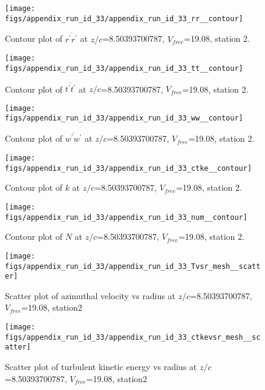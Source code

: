 \begin{figure}[H]
\centering
\texttt{[image: figs/appendix\_run\_id\_33/appendix\_run\_id\_33\_rr\_\_contour]}
\caption{Contour plot of $\overline{r^\prime r^\prime}$ at $z/c$=8.50393700787, $V_{free}$=19.08, station 2.}
\label{fig:appendix_run_id_33_rr__contour}
\end{figure}


\begin{figure}[H]
\centering
\texttt{[image: figs/appendix\_run\_id\_33/appendix\_run\_id\_33\_tt\_\_contour]}
\caption{Contour plot of $\overline{t^\prime t^\prime}$ at $z/c$=8.50393700787, $V_{free}$=19.08, station 2.}
\label{fig:appendix_run_id_33_tt__contour}
\end{figure}


\begin{figure}[H]
\centering
\texttt{[image: figs/appendix\_run\_id\_33/appendix\_run\_id\_33\_ww\_\_contour]}
\caption{Contour plot of $\overline{w^\prime w^\prime}$ at $z/c$=8.50393700787, $V_{free}$=19.08, station 2.}
\label{fig:appendix_run_id_33_ww__contour}
\end{figure}


\begin{figure}[H]
\centering
\texttt{[image: figs/appendix\_run\_id\_33/appendix\_run\_id\_33\_ctke\_\_contour]}
\caption{Contour plot of $k$ at $z/c$=8.50393700787, $V_{free}$=19.08, station 2.}
\label{fig:appendix_run_id_33_ctke__contour}
\end{figure}


\begin{figure}[H]
\centering
\texttt{[image: figs/appendix\_run\_id\_33/appendix\_run\_id\_33\_num\_\_contour]}
\caption{Contour plot of $N$ at $z/c$=8.50393700787, $V_{free}$=19.08, station 2.}
\label{fig:appendix_run_id_33_num__contour}
\end{figure}


\begin{figure}[H]
\centering
\texttt{[image: figs/appendix\_run\_id\_33/appendix\_run\_id\_33\_Tvsr\_mesh\_\_scatter]}
\caption{Scatter plot of azimuthal velocity vs radius at $z/c$=8.50393700787, $V_{free}$=19.08, station2}
\label{fig:appendix_run_id_33_Tvsr_mesh__scatter}
\end{figure}


\begin{figure}[H]
\centering
\texttt{[image: figs/appendix\_run\_id\_33/appendix\_run\_id\_33\_ctkevsr\_mesh\_\_scatter]}
\caption{Scatter plot of turbulent kinetic energy vs radius at $z/c$=8.50393700787, $V_{free}$=19.08, station2}
\label{fig:appendix_run_id_33_ctkevsr_mesh__scatter}
\end{figure}


